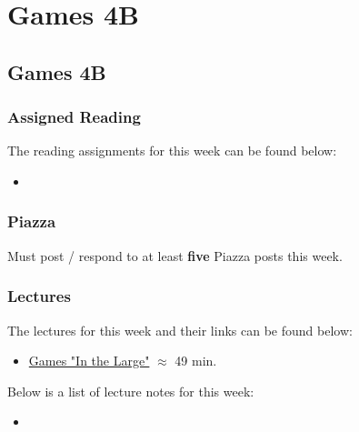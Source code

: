 \clearpage

\renewcommand{\ChapTitle}{Games 4B}
\renewcommand{\SectionTitle}{Games 4B}

\chapter{\ChapTitle}
\section{\SectionTitle}

\subsection{Assigned Reading}

The reading assignments for this week can be found below:

\begin{itemize}
    \item {}
\end{itemize}

\subsection{Piazza}

Must post / respond to at least \textbf{five} Piazza posts this week.  

\subsection{Lectures}

The lectures for this week and their links can be found below:

\begin{itemize}
    \item \href{https://www.youtube.com/watch?v=JiY4qqxsVag}{Games "In the Large"} $\approx$ 49 min.
\end{itemize}

\noindent Below is a list of lecture notes for this week:

\begin{itemize}
    \item {}
\end{itemize}

